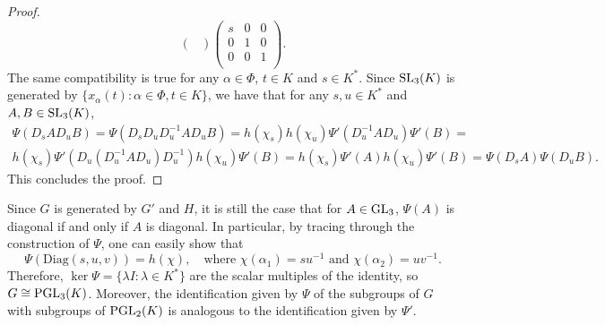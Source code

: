 \begin{proof}
$$\begin{pmatrix}
    \end{pmatrix}\begin{pmatrix}
        s & 0 & 0\\
        0 & 1 & 0\\
        0 & 0 & 1\\
    \end{pmatrix}.$$
    The same compatibility is true for any $\alpha\in\Phi$, $t\in K$ and $s\in K^*$. Since $\mathrm{SL}_3(K)$ is generated by $\{x_\alpha(t):\alpha\in\Phi, t\in K\}$, we have that for any $s,u\in K^*$ and $A,B\in\mathrm{SL}_3(K)$,
    \begin{align*}
        \Psi(D_sAD_uB)=\Psi(D_sD_uD_u^{-1}AD_uB)=h(\chi_{s})h(\chi_u)\Psi'(D_u^{-1}AD_u)\Psi'(B)=\\
        h(\chi_s)\Psi'(D_u(D_u^{-1}AD_u)D_u^{-1})h(\chi_u)\Psi'(B)=h(\chi_s)\Psi'(A)h(\chi_u)\Psi'(B)=\Psi(D_sA)\Psi(D_uB).
    \end{align*}
    This concludes the proof.
\end{proof}

Since $G$ is generated by $G'$ and $H$, it is still the case that for $A\in\mathrm{GL}_3$, $\Psi(A)$ is diagonal if and only if $A$ is diagonal. In particular, by tracing through the construction of $\Psi$, one can easily show that 
$$\Psi(\mathrm{Diag}(s,u,v))=h(\chi),\quad\text{where }\chi(\alpha_1)=su^{-1}\text{ and }\chi(\alpha_2)=uv^{-1}.$$
Therefore, $\ker\Psi=\{\lambda I:\lambda\in K^*\}$ are the scalar multiples of the identity, so $G\cong\mathrm{PGL}_3(K)$. Moreover, the identification given by $\Psi$ of the subgroups of $G$ with subgroups of $\mathrm{PGL}_2(K)$ is analogous to the identification given by $\Psi'$.
\fi


